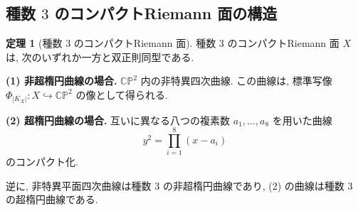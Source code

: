 \documentclass[dvipdfmx,a4paper,11pt]{article} %
\newcommand{\C}{\mathbb{C}}
\theoremstyle{definition}
\newtheorem{thm}{定理}[section]
\numberwithin{equation}{section}
\begin{document}
\subsection{種数 $3$ のコンパクトRiemann 面の構造}

\begin{thm}[種数 $3$ のコンパクトRiemann 面]\label{O-M368}
種数 $3$ のコンパクトRiemann 面 $X$ は,
次のいずれか一方と双正則同型である.

\medskip
\noindent
\textbf{(1) 非超楕円曲線の場合.}
$\C\mathbb P^2$ 内の非特異四次曲線.
この曲線は, 標準写像
$\Phi_{|K_X|}:X\hookrightarrow\C\mathbb P^2$ の像として得られる.

\medskip
\noindent
\textbf{(2) 超楕円曲線の場合.}
互いに異なる八つの複素数 $a_1,\ldots,a_8$ を用いた曲線
\[
y^2=\prod_{i=1}^8(x-a_i)
\]
のコンパクト化.

\medskip
逆に, 非特異平面四次曲線は種数 $3$ の非超楕円曲線であり,
(2) の曲線は種数 $3$ の超楕円曲線である.
\end{thm}
\end{document}
